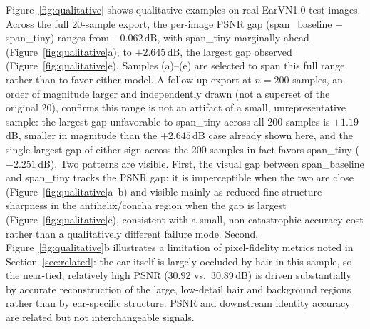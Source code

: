 \documentclass[pdflatex,sn-vancouver-num]{sn-jnl}
\begin{document}
Figure~\ref{fig:qualitative} shows qualitative examples on real EarVN1.0 test images. Across the full 20-sample export, the per-image PSNR gap (span\_baseline $-$ span\_tiny) ranges from $-0.062$\,dB, with span\_tiny marginally ahead (Figure~\ref{fig:qualitative}a), to $+2.645$\,dB, the largest gap observed (Figure~\ref{fig:qualitative}e). Samples (a)--(e) are selected to span this full range rather than to favor either model. A follow-up export at $n=200$ samples, an order of magnitude larger and independently drawn (not a superset of the original 20), confirms this range is not an artifact of a small, unrepresentative sample: the largest gap unfavorable to span\_tiny across all 200 samples is $+1.19$\,dB, smaller in magnitude than the $+2.645$\,dB case already shown here, and the single largest gap of either sign across the 200 samples in fact favors span\_tiny ($-2.251$\,dB). Two patterns are visible. First, the visual gap between span\_baseline and span\_tiny tracks the PSNR gap: it is imperceptible when the two are close (Figure~\ref{fig:qualitative}a--b) and visible mainly as reduced fine-structure sharpness in the antihelix/concha region when the gap is largest (Figure~\ref{fig:qualitative}e), consistent with a small, non-catastrophic accuracy cost rather than a qualitatively different failure mode. Second, Figure~\ref{fig:qualitative}b illustrates a limitation of pixel-fidelity metrics noted in Section~\ref{sec:related}: the ear itself is largely occluded by hair in this sample, so the near-tied, relatively high PSNR (30.92 vs.\ 30.89\,dB) is driven substantially by accurate reconstruction of the large, low-detail hair and background regions rather than by ear-specific structure. PSNR and downstream identity accuracy are related but not interchangeable signals.
\end{document}
